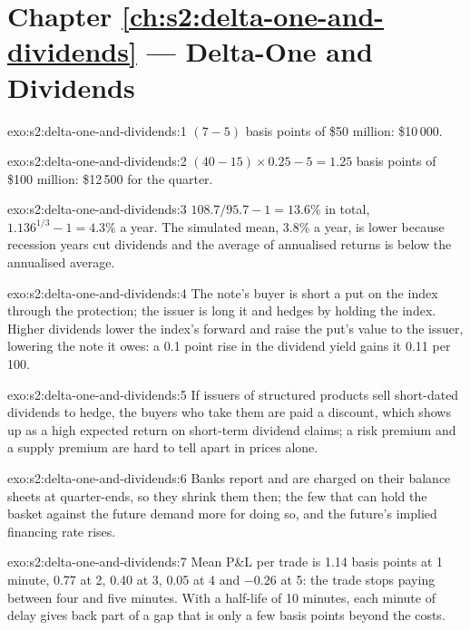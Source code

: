 \section*{Chapter \ref{ch:s2:delta-one-and-dividends} --- Delta-One and Dividends}

\begin{solution}{exo:s2:delta-one-and-dividends:1}
$(7 - 5)$ basis points of \$50 million: \$10\,000.
\end{solution}

\begin{solution}{exo:s2:delta-one-and-dividends:2}
$(40 - 15) \times 0.25 - 5 = 1.25$ basis points of \$100 million: \$12\,500 for the quarter.
\end{solution}

\begin{solution}{exo:s2:delta-one-and-dividends:3}
$108.7 / 95.7 - 1 = 13.6\%$ in total, $1.136^{1/3} - 1 = 4.3\%$ a year. The simulated mean, 3.8\% a year, is lower because recession years cut
dividends and the average of annualised returns is below the annualised average.
\end{solution}

\begin{solution}{exo:s2:delta-one-and-dividends:4}
The note's buyer is short a put on the index through the protection; the issuer is long it and hedges by holding the index. Higher dividends lower the
index's forward and raise the put's value to the issuer, lowering the note it owes: a 0.1 point rise in the dividend yield gains it 0.11 per 100.
\end{solution}

\begin{solution}{exo:s2:delta-one-and-dividends:5}
If issuers of structured products sell short-dated dividends to hedge, the buyers who take them are paid a discount, which shows up as a high expected
return on short-term dividend claims; a risk premium and a supply premium are hard to tell apart in prices alone.
\end{solution}

\begin{solution}{exo:s2:delta-one-and-dividends:6}
Banks report and are charged on their balance sheets at quarter-ends, so they shrink them then; the few that can hold the basket against the future
demand more for doing so, and the future's implied financing rate rises.
\end{solution}

\begin{solution}{exo:s2:delta-one-and-dividends:7}
Mean P\&L per trade is 1.14 basis points at 1 minute, 0.77 at 2, 0.40 at 3, 0.05 at 4 and $-0.26$ at 5: the trade stops paying between four and five
minutes. With a half-life of 10 minutes, each minute of delay gives back part of a gap that is only a few basis points beyond the costs.
\end{solution}

